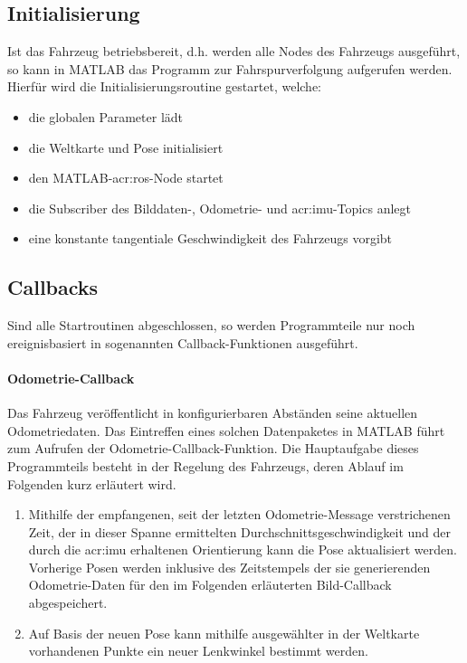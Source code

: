 \subsection{Initialisierung}
Ist das Fahrzeug betriebsbereit, d.h. werden alle Nodes des Fahrzeugs ausgeführt, so kann in MATLAB das Programm zur Fahrspurverfolgung aufgerufen werden. Hierfür wird die Initialisierungsroutine gestartet, welche:
\begin{itemize}
\item die globalen Parameter lädt
\item die Weltkarte und Pose initialisiert
\item den MATLAB-\gls{acr:ros}-Node startet
\item die Subscriber des Bilddaten-, Odometrie- und \gls{acr:imu}-Topics anlegt
\item eine konstante tangentiale Geschwindigkeit des Fahrzeugs vorgibt 
\end{itemize}

\subsection{Callbacks}
\label{ssec:software_struktur:matlab:callbacks}
Sind alle Startroutinen abgeschlossen, so werden Programmteile nur noch ereignisbasiert in sogenannten Callback-Funktionen ausgeführt.
 
\paragraph{Odometrie-Callback}
Das Fahrzeug veröffentlicht in konfigurierbaren Abständen seine aktuellen Odometriedaten.
Das Eintreffen eines solchen Datenpaketes in MATLAB führt zum Aufrufen der Odometrie-Callback-Funktion. Die Hauptaufgabe dieses Programmteils besteht in der Regelung des Fahrzeugs, deren Ablauf im Folgenden kurz erläutert wird.
\begin{enumerate}
\item Mithilfe der empfangenen, seit der letzten Odometrie-Message verstrichenen Zeit, der in dieser Spanne ermittelten Durchschnittsgeschwindigkeit und der durch die \gls{acr:imu} erhaltenen Orientierung kann die Pose aktualisiert werden. Vorherige Posen werden inklusive des Zeitstempels der sie generierenden Odometrie-Daten für den im Folgenden erläuterten Bild-Callback abgespeichert.
\item Auf Basis der neuen Pose kann mithilfe ausgewählter in der Weltkarte vorhandenen Punkte ein neuer Lenkwinkel bestimmt werden.
\end{enumerate}
